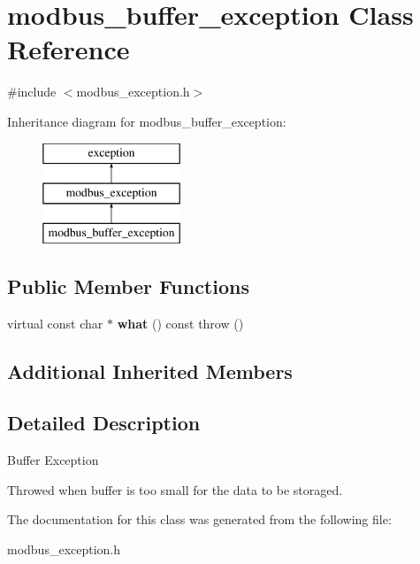 \hypertarget{classmodbus__buffer__exception}{}\section{modbus\+\_\+buffer\+\_\+exception Class Reference}
\label{classmodbus__buffer__exception}


{\ttfamily \#include $<$modbus\+\_\+exception.\+h$>$}

Inheritance diagram for modbus\+\_\+buffer\+\_\+exception\+:\begin{figure}[H]
\begin{center}
\leavevmode
\includegraphics[height=3.000000cm]{classmodbus__buffer__exception}
\end{center}
\end{figure}
\subsection*{Public Member Functions}
\begin{DoxyCompactItemize}
\item 
\mbox{\label{classmodbus__buffer__exception_ab348b2a69d7ad31d0deff7e00ec9bf27}} 
virtual const char $\ast$ {\bfseries what} () const  throw ()
\end{DoxyCompactItemize}
\subsection*{Additional Inherited Members}


\subsection{Detailed Description}
Buffer Exception

Throwed when buffer is too small for the data to be storaged. 

The documentation for this class was generated from the following file\+:\begin{DoxyCompactItemize}
\item 
modbus\+\_\+exception.\+h\end{DoxyCompactItemize}
